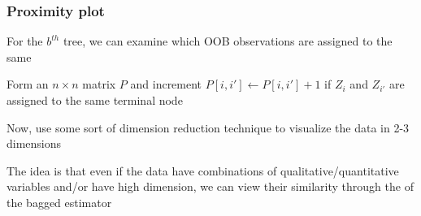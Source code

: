 \documentclass[12pt]{beamer}
\begin{document}
\begin{frame}
\frametitle{Proximity plot}
For the $b^{th}$ tree, we can examine which OOB observations are assigned to the same 

\vsp
Form an $n \times n$ matrix $P$ and increment $P[i,i'] \leftarrow P[i,i'] + 1$ if $Z_{i}$ and $Z_{i'}$ are assigned to the same terminal node

\vsp
Now, use some sort of dimension reduction technique to visualize the data in 2-3 dimensions


\vsp
The idea is that even if the data have combinations of qualitative/quantitative variables and/or have high
dimension, we can view their similarity through the  of the bagged estimator
\end{frame}



%
%
%
%
%
%
%
%
%
%
%
%
\end{document}
